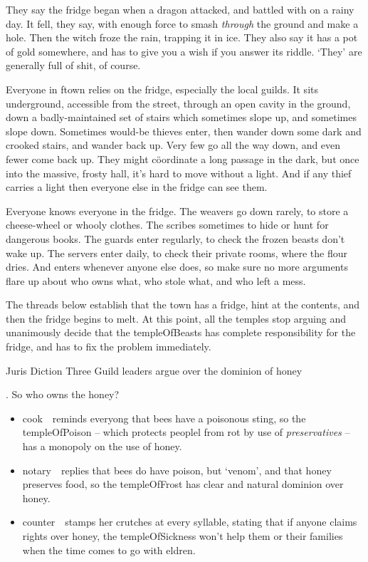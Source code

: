 
\begin{exampletext}
  \noindent
  They say the fridge began when a dragon attacked, and battled with  on a rainy day.
  It fell, they say, with enough force to smash \emph{through} the ground and make a hole.
  Then the \gls{witch} froze the rain, trapping it in ice.
  They also say it has a pot of gold somewhere, and has to give you a wish if you answer its riddle.
  `They' are generally full of shit, of course.
\end{exampletext}

Everyone in \gls{ftown} relies on the fridge, especially the local guilds.
It sits underground, accessible from the street, through an open cavity in the ground, down a badly-maintained set of stairs which sometimes slope up, and sometimes slope down.
Sometimes would-be thieves enter, then wander down some dark and crooked stairs, and wander back up.
Very few go all the way down, and even fewer come back up.
They might c\"oordinate a long passage in the dark, but once into the massive, frosty hall, it's hard to move without a light.
And if any thief carries a light then everyone else in the fridge can see them.

Everyone knows everyone in the fridge.
The \glspl{weaver} go down rarely, to store a cheese-wheel or whooly clothes.
The \glspl{scribe} sometimes to hide or hunt for dangerous books.
The \glspl{guard} enter regularly, to check the frozen beasts don't wake up.
The \glspl{server} enter daily, to check their private rooms, where the flour dries.
And  enters whenever anyone else does, so make sure no more arguments flare up about who owns what, who stole what, and who left a mess.

The \glspl{thread} below establish that the town has a fridge, hint at the contents, and then the fridge begins to melt.
At this point, all the \glspl{temple} stop arguing and unanimously decide that the \gls{templeOfBeasts} has complete responsibility for the fridge, and has to fix the problem immediately.

{Juris Diction}%
{Three Guild leaders argue over the dominion of honey}%

.
So who owns the honey?

\begin{itemize}
  \item
  \Gls{cook}~\composeHumanName\ reminds everyong that bees have a poisonous sting, so the \gls{templeOfPoison} -- which protects peoplel from rot by use of \emph{preservatives} -- has a monopoly on the use of honey.
  \item
  \Gls{notary}~\composeHumanName\ replies that bees do have poison, but `venom', and that honey preserves food, so the \gls{templeOfFrost} has clear and natural dominion over honey.
  \item
  \Gls{counter}~\composeHumanName\ stamps her crutches at every syllable, stating that if anyone claims rights over honey, the \gls{templeOfSickness} won't help them or their families when the time comes to go with \gls{eldren}.
\end{itemize}

